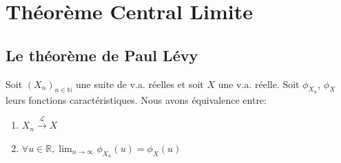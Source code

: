 \chapter{Théorème Central Limite}
\sloppy


\section{Le théorème de Paul Lévy}
\begin{theorem}
Soit $(X_n)_{n \in \mathbb{N}}$ une suite de v.a. réelles et soit $X$ une v.a. réelle. Soit $\phi_{X_n}$, $\phi_X$ leurs fonctions caractéristiques. Nous avons équivalence entre:
\begin{enumerate}
    \item[i)] $X_n \xrightarrow{\mathcal{L}} X$
    \item[ii)] $\forall u \in \mathbb{R}, \lim_{n \to \infty} \phi_{X_n}(u) = \phi_X(u)$
\end{enumerate}
\end{theorem}
